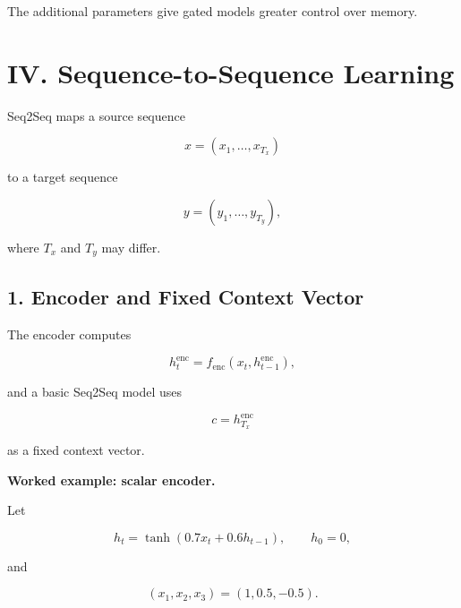 \documentclass[11pt,a4paper,twoside]{article}
\begin{document}
The additional parameters give gated models greater control over memory.

\section*{IV. Sequence-to-Sequence Learning}

Seq2Seq maps a source sequence

\[
x=(x_1,\ldots,x_{T_x})
\]

to a target sequence

\[
y=(y_1,\ldots,y_{T_y}),
\]

where $T_x$ and $T_y$ may differ.

\begin{center}
\end{center}

\subsection*{1. Encoder and Fixed Context Vector}

The encoder computes

\[
h_t^{\mathrm{enc}}=f_{\mathrm{enc}}(x_t,h_{t-1}^{\mathrm{enc}}),
\]

and a basic Seq2Seq model uses

\[
\boxed{c=h_{T_x}^{\mathrm{enc}}}
\]

as a fixed context vector.

\textbf{Worked example: scalar encoder.}

Let

\[
h_t=\tanh(0.7x_t+0.6h_{t-1}),
\qquad h_0=0,
\]

and

\[
(x_1,x_2,x_3)=(1,0.5,-0.5).
\]
\end{document}
